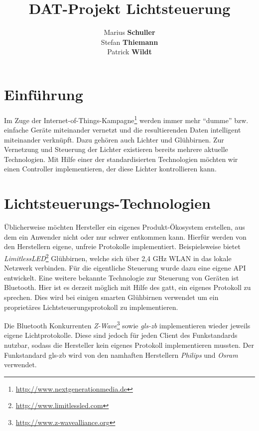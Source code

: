 \documentclass[a4paper,12pt]{article}
\begin{document}
\title{DAT-Projekt Lichtsteuerung}
\author{Marius \textbf{Schuller}\\
        Stefan \textbf{Thiemann}\\
		Patrick \textbf{Wildt}}
\maketitle

\newpage

\tableofcontents

\onehalfspacing

\newpage

\section{Einführung}
\label{einfuehrung}

Im Zuge der Internet-of-Things-Kampagne\footnote{\url{http://www.nextgenerationmedia.de}}
werden immer mehr ``dumme'' bzw. einfache Geräte miteinander vernetzt und die
resultierenden Daten intelligent miteinander verknüpft. Dazu gehören auch Lichter und
Glühbirnen. Zur Vernetzung und Steuerung der Lichter existieren bereits mehrere
aktuelle Technologien. Mit Hilfe einer der standardisierten Technologien möchten wir
einen Controller implementieren, der diese Lichter kontrollieren kann.

\section{Lichtsteuerungs-Technologien}
\label{technology}

Üblicherweise möchten Hersteller ein eigenes Produkt-Ökosystem erstellen, aus dem ein
Anwender nicht oder nur schwer entkommen kann. Hierfür werden von den Herstellern
eigene, unfreie Protokolle implementiert. Beispielsweise bietet
\textit{LimitlessLED}\footnote{\url{http://www.limitlessled.com}} Glühbirnen, welche sich
über 2,4 GHz WLAN in das lokale Netzwerk verbinden. Für die eigentliche
Steuerung wurde dazu eine eigene API entwickelt. Eine weitere bekannte Technologie
zur Steuerung von Geräten ist Bluetooth. Hier ist es derzeit möglich
mit Hilfe des \gls{gatt}, ein eigenes Protokoll zu sprechen. Dies wird bei einigen
smarten Glühbirnen verwendet um ein proprietäres Lichtsteuerungsprotokoll zu implementieren.

Die Bluetooth Konkurrenten \textit{Z-Wave}\footnote{\url{http://www.z-wavealliance.org}} sowie
\textit{\gls{gls-zb}} implementieren wieder jeweils eigene Lichtprotokolle. Diese
sind jedoch für jeden Client des Funkstandards nutzbar, sodass die Hersteller kein
eigenes Protokoll implementieren mussten. Der Funkstandard \gls{gls-zb} wird
von den namhaften Herstellern \textit{Philips} und \textit{Osram} verwendet.
\end{document}
